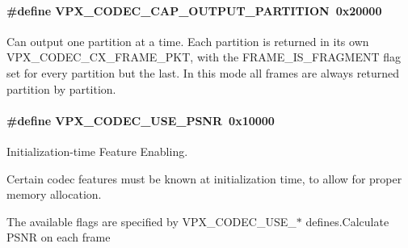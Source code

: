 \paragraph[{\texorpdfstring{V\+P\+X\+\_\+\+C\+O\+D\+E\+C\+\_\+\+C\+A\+P\+\_\+\+O\+U\+T\+P\+U\+T\+\_\+\+P\+A\+R\+T\+I\+T\+I\+ON}{VPX_CODEC_CAP_OUTPUT_PARTITION}}]{\setlength{\rightskip}{0pt plus 5cm}\#define V\+P\+X\+\_\+\+C\+O\+D\+E\+C\+\_\+\+C\+A\+P\+\_\+\+O\+U\+T\+P\+U\+T\+\_\+\+P\+A\+R\+T\+I\+T\+I\+ON~0x20000}\hypertarget{group__encoder_ga69768adb51faa28d98870cbc77e9ea93}{}\label{group__encoder_ga69768adb51faa28d98870cbc77e9ea93}
Can output one partition at a time. Each partition is returned in its own V\+P\+X\+\_\+\+C\+O\+D\+E\+C\+\_\+\+C\+X\+\_\+\+F\+R\+A\+M\+E\+\_\+\+P\+KT, with the F\+R\+A\+M\+E\+\_\+\+I\+S\+\_\+\+F\+R\+A\+G\+M\+E\+NT flag set for every partition but the last. In this mode all frames are always returned partition by partition. 
\paragraph[{\texorpdfstring{V\+P\+X\+\_\+\+C\+O\+D\+E\+C\+\_\+\+U\+S\+E\+\_\+\+P\+S\+NR}{VPX_CODEC_USE_PSNR}}]{\setlength{\rightskip}{0pt plus 5cm}\#define V\+P\+X\+\_\+\+C\+O\+D\+E\+C\+\_\+\+U\+S\+E\+\_\+\+P\+S\+NR~0x10000}\hypertarget{group__encoder_ga57bb9eb1881c7e4bf86580660a5e40a0}{}\label{group__encoder_ga57bb9eb1881c7e4bf86580660a5e40a0}


Initialization-\/time Feature Enabling. 

Certain codec features must be known at initialization time, to allow for proper memory allocation.

The available flags are specified by V\+P\+X\+\_\+\+C\+O\+D\+E\+C\+\_\+\+U\+S\+E\+\_\+$\ast$ defines.\+Calculate P\+S\+NR on each frame 
